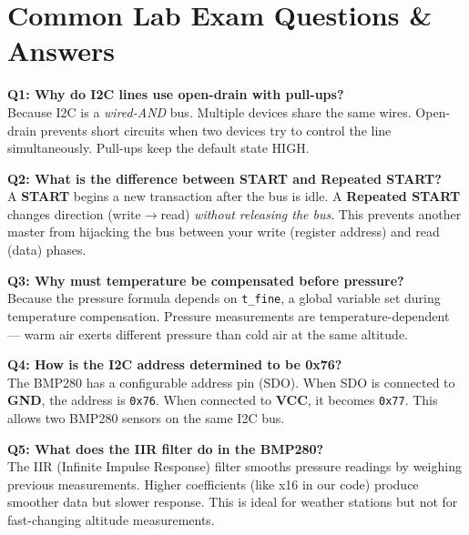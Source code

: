 \documentclass[12pt, a4paper]{article}
\begin{document}
\section{Common Lab Exam Questions \& Answers}

\begin{tcolorbox}[enhanced, colback=accentblue!5, colframe=accentblue, arc=6pt, title={\large\faIcon{question-circle}\ \ Frequently Asked Questions}, coltitle=white, colbacktitle=accentblue, fonttitle=\bfseries, breakable]

\textbf{\textcolor{accentblue}{Q1: Why do I2C lines use open-drain with pull-ups?}}\\
Because I2C is a \textit{wired-AND} bus. Multiple devices share the same wires. Open-drain prevents short circuits when two devices try to control the line simultaneously. Pull-ups keep the default state HIGH.

\vspace{0.4cm}
\textbf{\textcolor{accentblue}{Q2: What is the difference between START and Repeated START?}}\\
A \textbf{START} begins a new transaction after the bus is idle. A \textbf{Repeated START} changes direction (write$\rightarrow$read) \textit{without releasing the bus}. This prevents another master from hijacking the bus between your write (register address) and read (data) phases.

\vspace{0.4cm}
\textbf{\textcolor{accentblue}{Q3: Why must temperature be compensated before pressure?}}\\
Because the pressure formula depends on \texttt{t\_fine}, a global variable set during temperature compensation. Pressure measurements are temperature-dependent --- warm air exerts different pressure than cold air at the same altitude.

\vspace{0.4cm}
\textbf{\textcolor{accentblue}{Q4: How is the I2C address determined to be 0x76?}}\\
The BMP280 has a configurable address pin (SDO). When SDO is connected to \textbf{GND}, the address is \texttt{0x76}. When connected to \textbf{VCC}, it becomes \texttt{0x77}. This allows two BMP280 sensors on the same I2C bus.

\vspace{0.4cm}
\textbf{\textcolor{accentblue}{Q5: What does the IIR filter do in the BMP280?}}\\
The IIR (Infinite Impulse Response) filter smooths pressure readings by weighing previous measurements. Higher coefficients (like x16 in our code) produce smoother data but slower response. This is ideal for weather stations but not for fast-changing altitude measurements.


\end{tcolorbox}
\end{document}
